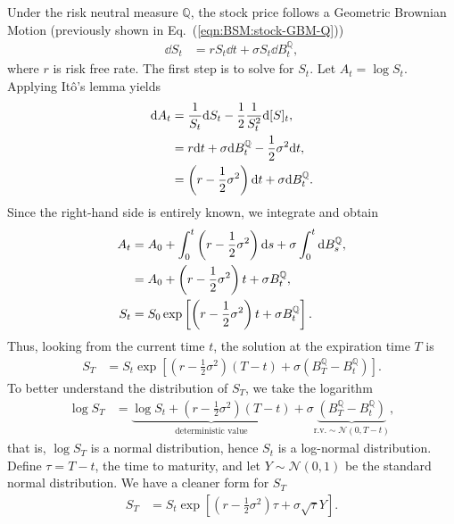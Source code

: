 \documentclass{book}
\begin{document}
Under the risk neutral measure $\mathbb{Q}$, the stock price follows a Geometric Brownian Motion (previously shown in Eq.~(\ref{eqn:BSM:stock-GBM-Q}))
\begin{align*}
    \dd S_t &= r S_t \dd t +\sigma S_t \dd B_t^\mathbb{Q},
\end{align*}
where $r$ is risk free rate. The first step is to solve for $S_t$. Let $A_t = \log S_t$. Applying Itô’s lemma yields
\begin{align}
    \dd A_t &= \frac{1}{S_t} \dd S_t - \frac{1}{2} \frac{1}{S_t^2} {\dd} {[S]_t}, \notag\\
    &= r \dd t +\sigma \dd B_t^\mathbb{Q} - \frac{1}{2} \sigma^2 \dd t, \notag\\
    &= \left(r - \frac{1}{2} \sigma^2\right) \dd t + \sigma  \dd B_t^\mathbb{Q}.
\end{align}
Since the right-hand side is entirely known, we integrate and obtain
\begin{align}
    A_t &= A_0 + \int_0^t \left(r - \frac{1}{2} \sigma^2\right) \dd s + \sigma \int_0^t \dd B_s^\mathbb{Q}, \notag\\
    &=  A_0 + \left(r - \frac{1}{2} \sigma^2\right)t+ \sigma  B_t^\mathbb{Q}, \notag\\
    S_t &= {S_0} \exp \left[ \left(r - \frac{1}{2} \sigma^2\right)t + \sigma  B_t^\mathbb{Q} \right].
\end{align}
Thus, looking from the current time $t$, the solution at the expiration time $T$ is 
\begin{align}
    S_T &= {S_t} \exp \left[ \left(r - \frac{1}{2} \sigma^2\right)(T - t) + \sigma  \left(B_T^\mathbb{Q} - B_t^\mathbb{Q}\right) \right].
\end{align}
To better understand the distribution of $S_T$, we take the logarithm
\begin{align}
    \log S_T &= \underbrace{\log {S_t} + \left(r - \frac{1}{2} \sigma^2\right)(T - t)}_{\text{deterministic value}} + \sigma \underbrace{\left(B_T^\mathbb{Q} - B_t^\mathbb{Q}\right)}_{\text{r.v.} \sim \mathcal{N}(0,  T - t)},
\end{align}
that is, $\log S_T$ is a normal distribution, hence $S_t$ is a log-normal distribution. Define $\tau = T - t$, the time to maturity, and let $Y\sim \mathcal{N}(0,1)$ be the standard normal distribution. We have a cleaner form for $S_T$
\begin{align}
    S_T &= {S_t} \exp \left[ \left(r - \frac{1}{2} \sigma^2\right)\tau + \sigma  \sqrt{\tau} Y \right].
\end{align}
\end{document}

